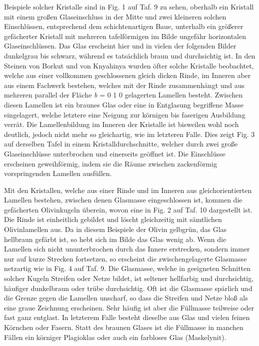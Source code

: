 \documentclass[a4paper, 12pt, oneside]{article}
\begin{document}
Beispiele solcher Kristalle sind in Fig. 1 auf Taf. 9 zu sehen, oberhalb ein Kristall mit einem großen Glaseinschluss in der Mitte und zwei kleineren solchen Einschlüssen, entsprechend dem schichtenartigen Baue, unterhalb ein größerer gefächerter Kristall mit mehreren tafelförmigen im Bilde ungefähr horizontalen Glaseinschlüssen. Das Glas erscheint hier und in vielen der folgenden Bilder dunkelgrau bis schwarz, während es tatsächlich braun und durchsichtig ist. In den Steinen von Borkut und von Knyahinya wurden öfter solche Kristalle beobachtet, welche aus einer vollkommen geschlossenen gleich dicken Rinde, im Inneren aber aus einem Fachwerk bestehen, welches mit der Rinde zusammenhängt und aus mehreren parallel der Fläche \emph{b} = 0 1 0 gelagerten Lamellen besteht. Zwischen diesen Lamellen ist ein braunes Glas oder eine in Entglasung begriffene Masse eingelagert, welche letztere eine Neigung zur körnigen bis faserigen Ausbildung verrät. Die Lamellenbildung im Inneren der Kristalle ist bisweilen wohl noch deutlich, jedoch nicht mehr so gleichartig, wie im letzteren Falle. Dies zeigt Fig. 3 auf derselben Tafel in einem Kristalldurchschnitte, welcher durch zwei große Glaseinschlüsse unterbrochen und einerseits geöffnet ist. Die Einschlüsse erscheinen geweihförmig, indem sie die Räume zwischen zackenförmig vorspringenden Lamellen ausfüllen.

Mit den Kristallen, welche aus einer Rinde und im Inneren aus gleichorientierten Lamellen bestehen, zwischen denen Glasmasse eingeschlossen ist, kommen die gefächerten Olivinkugeln überein, wovon eine in Fig. 2 auf Taf. 10 dargestellt ist. Die Rinde ist einheitlich gebildet und löscht gleichzeitig mit sämtlichen Olivinlamellen aus. Da in diesem Beispiele der Olivin gelbgrün, das Glas hellbraun gefärbt ist, so hebt sich im Bilde das Glas wenig ab. Wenn die Lamellen sich nicht ununterbrochen durch das Innere erstrecken, sondern immer nur auf kurze Strecken fortsetzen, so erscheint die zwischengelagerte Glasmasse netzartig wie in Fig. 4 auf Taf. 9. Die Glasmasse, welche in geeigneten Schnitten solcher Kugeln Streifen oder Netze bildet, ist seltener hellfarbig und durchsichtig, häufiger dunkelbraun oder trübe durchsichtig. Oft ist die Glasmasse spärlich und die Grenze gegen die Lamellen unscharf, so dass die Streifen und Netze bloß als eine graue Zeichnung erscheinen. Sehr häufig ist aber die Füllmasse teilweise oder fast ganz entglast. In letzterem Falle besteht dieselbe aus Glas und vielen feinen Körnchen oder Fasern. Statt des braunen Glases ist die Füllmasse in manchen Fällen ein körniger Plagioklas oder auch ein farbloses Glas (Maskelynit).
\end{document}
